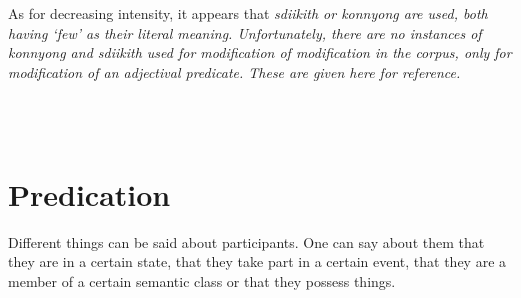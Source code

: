 %

As for decreasing intensity, it appears that \em sdiikith \em or \em konnyong \em are used, both having `few' as their literal meaning. Unfortunately, there are no instances of \em konnyong \em and \em sdiikith \em used for modification of modification in the corpus, only for modification of an adjectival predicate. These are given here for reference.


 \\

 \\

%



\section{Predication}\label{sec:func:Predication}
Different things  can be said about participants. One can say about them that they are in a certain state, that they take part  in a certain event, that they are a member of a certain semantic class or that they possess things.


